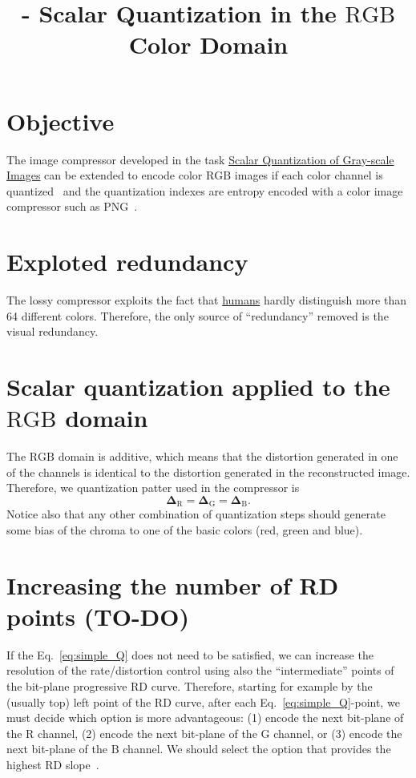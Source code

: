 

\title{\SM{} - Scalar Quantization in the $\text{RGB}$ Color Domain}

\maketitle
\tableofcontents

\section{Objective}
The image compressor developed in the task
\href{https://sistemas-multimedia.github.io/contents/gray_SQ/}{Scalar
  Quantization of Gray-scale Images} can be extended to encode color
$\text{RGB}$ images if each color channel is
quantized~\cite{vruiz__scalar_quantization} and the quantization
indexes are entropy encoded with a color image compressor such as
PNG~\cite{vruiz__PNG}.

\section{Exploted redundancy}
The lossy compressor exploits the fact that
\href{https://en.wikipedia.org/wiki/Visual_system}{humans} hardly
distinguish more than 64 different colors. Therefore, the only source of ``redundancy'' removed is the visual redundancy.

\section{Scalar quantization applied to the $\text{RGB}$ domain}
The $\text{RGB}$ domain is additive, which means that the distortion
generated in one of the channels is identical to the distortion
generated in the reconstructed image. Therefore, we quantization patter used in the compressor is
\begin{equation}
  \mathbf{\Delta}_{\text{R}} = \mathbf{\Delta}_{\text{G}} =
  \mathbf{\Delta}_{\text{B}}.
  \label{eq:simple_Q}
\end{equation}
Notice also that any other combination of quantization steps should
generate some bias of the chroma to one of the basic colors (red,
green and blue).

\section{Increasing the number of RD points (TO-DO)}
\label{sec:increasing}
If the Eq.~\eqref{eq:simple_Q} does not need to be satisfied, we can
increase the resolution of the rate/distortion control using also the
``intermediate'' points of the bit-plane progressive RD
curve. Therefore, starting for example by the (usually top) left point
of the RD curve, after each Eq.~\eqref{eq:simple_Q}-point, we must
decide which option is more advantageous: (1) encode the next
bit-plane of the $\text{R}$ channel, (2) encode the next bit-plane of
the $\text{G}$ channel, or (3) encode the next bit-plane of the
$\text{B}$ channel. We should select the option that provides the
highest RD slope~\cite{vruiz__information_theory}.

